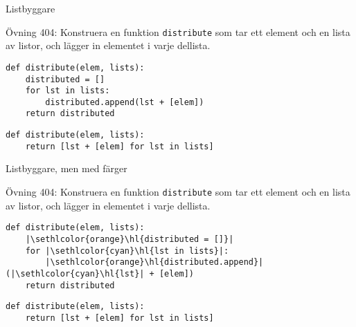 \makeatletter
\let\HL\hl
\renewcommand\hl{%
  \let\set@color\beamerorig@set@color
  \let\reset@color\beamerorig@reset@color
  \HL}
\makeatother

\makeatletter
\let\UL\ul
\renewcommand\ul{%
  \let\set@color\beamerorig@set@color
  \let\reset@color\beamerorig@reset@color
  \UL}
\makeatother

\lstset{basicstyle=\ttfamily,language=python,escapeinside=||}

\begin{frame}[fragile]{Listbyggare}

  Övning 404: Konstruera en funktion \texttt{distribute} som tar ett element och
  en lista av listor, och lägger in elementet i varje dellista.

  \pause{}

  \begin{lstlisting}
def distribute(elem, lists):
    distributed = []
    for lst in lists:
        distributed.append(lst + [elem])
    return distributed
  \end{lstlisting}

  \pause{}

  \begin{lstlisting}
def distribute(elem, lists):
    return [lst + [elem] for lst in lists]
  \end{lstlisting}

\end{frame}

\begin{frame}[fragile]{Listbyggare, men med färger}

  Övning 404: Konstruera en funktion \texttt{distribute} som tar ett element och
  en lista av listor, och lägger in elementet i varje dellista.

  \begin{lstlisting}
def distribute(elem, lists):
    |\sethlcolor{orange}\hl{distributed = []}|
    for |\sethlcolor{cyan}\hl{lst in lists}|:
        |\sethlcolor{orange}\hl{distributed.append}|(|\sethlcolor{cyan}\hl{lst}| + [elem])
    return distributed
  \end{lstlisting}

  \begin{lstlisting}
def distribute(elem, lists):
    return [lst + [elem] for lst in lists]
  \end{lstlisting}

\end{frame}

